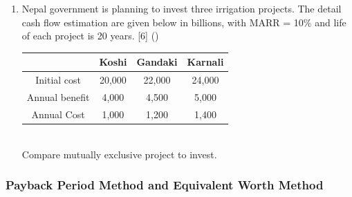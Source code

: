 \documentclass[12pt]{article}
\begin{document}
\begin{enumerate}
		\item Nepal government is planning to invest three irrigation projects. The detail cash flow estimation are given below in billions, with MARR = 10\% and life of each project is 20 years. \hfill [6] ()
		\begin{tabular}{|c|c|c|c|}
			\hline
			& Koshi & Gandaki & Karnali \\ \hline
			Initial cost & 20,000 & 22,000 & 24,000 \\ \hline
			Annual benefit & 4,000 & 4,500 & 5,000 \\ \hline
			Annual Cost & 1,000 & 1,200 & 1,400 \\ \hline
		\end{tabular}\\
		Compare mutually exclusive project to invest.
	\end{enumerate}
	
	\subsubsection{Payback Period Method and Equivalent Worth Method}
\end{document}
